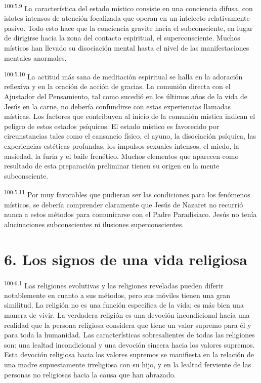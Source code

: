 \documentclass[twoside, 11pt]{book}
\begin{document}
\par
\textsuperscript{100:5.9} La característica del estado místico consiste en una conciencia difusa, con islotes intensos de atención focalizada que operan en un intelecto relativamente pasivo. Todo esto hace que la conciencia gravite hacia el subconsciente, en lugar de dirigirse hacia la zona del contacto espiritual, el superconsciente. Muchos místicos han llevado su disociación mental hasta el nivel de las manifestaciones mentales anormales.

\par
\textsuperscript{100:5.10} La actitud más sana de meditación espiritual se halla en la adoración reflexiva y en la oración de acción de gracias. La comunión directa con el Ajustador del Pensamiento, tal como sucedió en los últimos años de la vida de Jesús en la carne, no debería confundirse con estas experiencias llamadas místicas. Los factores que contribuyen al inicio de la comunión mística indican el peligro de estos estados psíquicos. El estado místico es favorecido por circunstancias tales como el cansancio físico, el ayuno, la disociación psíquica, las experiencias estéticas profundas, los impulsos sexuales intensos, el miedo, la ansiedad, la furia y el baile frenético. Muchos elementos que aparecen como resultado de esta preparación preliminar tienen su origen en la mente subconsciente.

\par
\textsuperscript{100:5.11} Por muy favorables que pudieran ser las condiciones para los fenómenos místicos, se debería comprender claramente que Jesús de Nazaret no recurrió nunca a estos métodos para comunicarse con el Padre Paradisiaco. Jesús no tenía alucinaciones subconscientes ni ilusiones superconscientes.

\section*{6. Los signos de una vida religiosa}
\par
\textsuperscript{100:6.1} Las religiones evolutivas y las religiones reveladas pueden diferir notablemente en cuanto a sus métodos, pero sus móviles tienen una gran similitud. La religión no es una función específica de la vida; es más bien una manera de vivir. La verdadera religión es una devoción incondicional hacia una realidad que la persona religiosa considera que tiene un valor supremo para él y para toda la humanidad. Las características sobresalientes de todas las religiones son: una lealtad incondicional y una devoción sincera hacia los valores supremos. Esta devoción religiosa hacia los valores supremos se manifiesta en la relación de una madre supuestamente irreligiosa con su hijo, y en la lealtad ferviente de las personas no religiosas hacia la causa que han abrazado.
\end{document}
